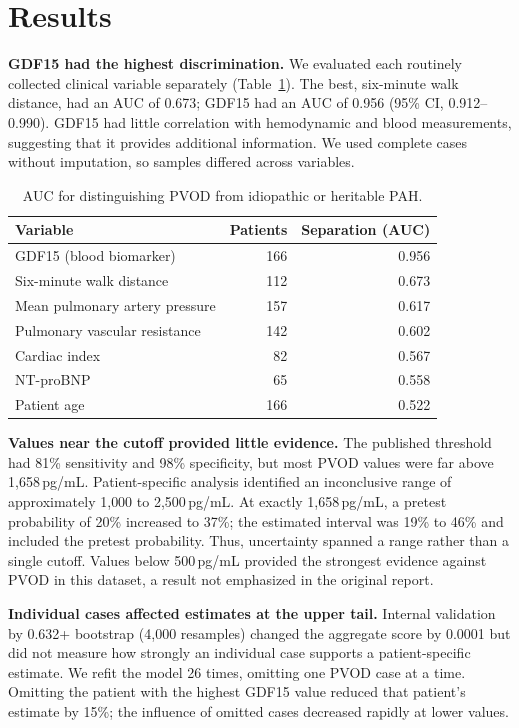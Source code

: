 \documentclass{article}
\begin{document}
\section{Results}

\textbf{GDF15 had the highest discrimination.} We evaluated each routinely collected
clinical variable separately (Table~\ref{tab:auc}). The best, six-minute walk distance,
had an AUC of 0.673; GDF15 had an AUC of 0.956 (95\% CI, 0.912--0.990). GDF15 had little
correlation with hemodynamic and blood measurements, suggesting that it provides
additional information. We used complete cases without imputation, so samples differed
across variables.

\begin{table}[t]
\caption{AUC for distinguishing PVOD from idiopathic or heritable PAH.}
\label{tab:auc}
\centering
\small
\begin{tabular}{lrr}
\toprule
Variable & Patients & Separation (AUC) \\
\midrule
GDF15 (blood biomarker)        & 166 & 0.956 \\
Six-minute walk distance       & 112 & 0.673 \\
Mean pulmonary artery pressure & 157 & 0.617 \\
Pulmonary vascular resistance  & 142 & 0.602 \\
Cardiac index                  &  82 & 0.567 \\
NT-proBNP                      &  65 & 0.558 \\
Patient age                    & 166 & 0.522 \\
\bottomrule
\end{tabular}
\end{table}

\textbf{Values near the cutoff provided little evidence.} The published threshold had
81\% sensitivity and 98\% specificity, but most PVOD values were far above
1{,}658\,pg/mL. Patient-specific analysis identified an inconclusive range of
approximately 1{,}000 to 2{,}500\,pg/mL. At exactly 1{,}658\,pg/mL, a pretest probability
of 20\% increased to 37\%; the estimated interval was 19\% to 46\% and included the
pretest probability. Thus, uncertainty spanned a range rather than a single cutoff.
Values below 500\,pg/mL provided the strongest evidence against PVOD in this dataset, a
result not emphasized in the original report.

\textbf{Individual cases affected estimates at the upper tail.} Internal validation by
0.632+ bootstrap (4{,}000 resamples) changed the aggregate score by 0.0001 but did not
measure how strongly an individual case supports a patient-specific estimate. We refit
the model 26 times, omitting one PVOD case at a time. Omitting the patient with the
highest GDF15 value reduced that patient's estimate by 15\%; the influence of omitted
cases decreased rapidly at lower values.
\end{document}
